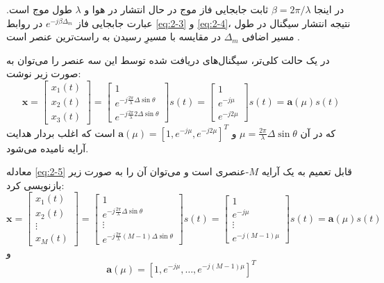 در اینجا $\beta = 2\pi / \lambda$ ثابت جابجایی فاز موج در حال انتشار در هوا و $\lambda$ طول موج است. عبارت جابجایی فاز $e^{-j\beta\Delta_m}$ در روابط \eqref{eq:2-3} و \eqref{eq:2-4}، نتیجه انتشار سیگنال در طول مسیر اضافی $\Delta_m$ در مقایسه با مسیرِ رسیدن به راست‌ترین عنصر است \cite{1}.

در یک حالت کلی‌تر، سیگنال‌های دریافت شده توسط این سه عنصر را می‌توان به صورت زیر نوشت:
\begin{equation}
	\bm{x} = 
	\begin{bmatrix}
		x_1(t) \\
		x_2(t) \\
		x_3(t)
	\end{bmatrix} =
	\begin{bmatrix}
		1 \\
		e^{-j \frac{2\pi}{\lambda} \Delta \sin \theta} \\
		e^{-j \frac{2\pi}{\lambda} 2\Delta \sin \theta}
	\end{bmatrix} s(t) = 
	\begin{bmatrix}
		1 \\
		e^{-j\mu} \\
		e^{-j2\mu}
	\end{bmatrix} s(t) = \bm{a}(\mu) s(t)
	\label{eq:2-5}
\end{equation}
که در آن $\mu = \frac{2\pi}{\lambda} \Delta \sin \theta$ و $\bm{a}(\mu) = [1, e^{-j\mu}, e^{-j2\mu}]^T$ است که اغلب بردار هدایت آرایه نامیده می‌شود.

معادله \eqref{eq:2-5} قابل تعمیم به یک آرایه $M$-عنصری است و می‌توان آن را به صورت زیر بازنویسی کرد:
\begin{equation}
	\bm{x} = 
	\begin{bmatrix}
		x_1(t) \\
		x_2(t) \\
		\vdots \\
		x_M(t)
	\end{bmatrix} = 
	\begin{bmatrix}
		1 \\
		e^{-j \frac{2\pi}{\lambda} \Delta \sin \theta} \\
		\vdots \\
		e^{-j \frac{2\pi}{\lambda} (M-1)\Delta \sin \theta}
	\end{bmatrix} s(t) = 
	\begin{bmatrix}
		1 \\
		e^{-j\mu} \\
		\vdots \\
		e^{-j(M-1)\mu}
	\end{bmatrix} s(t) = \bm{a}(\mu) s(t)
	\label{eq:2-6}
\end{equation}
و
\begin{equation}
	\bm{a}(\mu) = [1, e^{-j\mu}, \dots, e^{-j(M-1)\mu}]^T
	\nonumber
\end{equation}

